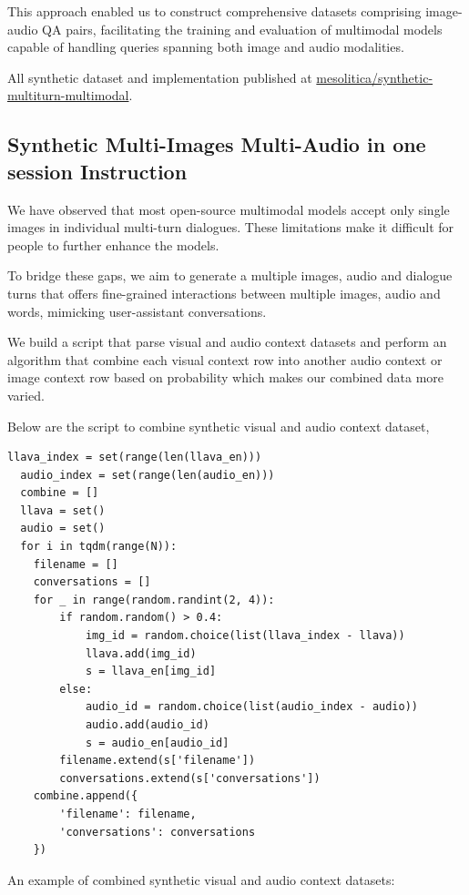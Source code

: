 \documentclass[preprint]{article}
\begin{document}
This approach enabled us to construct comprehensive datasets comprising image-audio QA pairs, facilitating the training and evaluation of multimodal models capable of handling queries spanning both image and audio modalities.

All synthetic dataset and implementation published at \href{https://huggingface.co/datasets/mesolitica/synthetic-multiturn-multimodal#multi-images-multi-audio}{mesolitica/synthetic-multiturn-multimodal}.

\subsection{Synthetic Multi-Images Multi-Audio in one session Instruction}

We have observed that most open-source multimodal models accept only single images in individual multi-turn dialogues. These limitations make it difficult for people to further enhance the models.

To bridge these gaps, we aim to generate a multiple images, audio and dialogue turns that offers fine-grained interactions between multiple images, audio and words, mimicking user-assistant conversations.

We build a script that parse visual and audio context datasets and perform an algorithm that combine each visual context row into another audio context or image context row based on probability which makes our combined data more varied.

Below are the script to combine synthetic visual and audio context dataset,

\begin{lstlisting}[breaklines=true]
  llava_index = set(range(len(llava_en)))
  audio_index = set(range(len(audio_en)))
  combine = []
  llava = set()
  audio = set()
  for i in tqdm(range(N)):
    filename = []
    conversations = []
    for _ in range(random.randint(2, 4)):
        if random.random() > 0.4:
            img_id = random.choice(list(llava_index - llava))
            llava.add(img_id)
            s = llava_en[img_id]
        else:
            audio_id = random.choice(list(audio_index - audio))
            audio.add(audio_id)
            s = audio_en[audio_id]
        filename.extend(s['filename'])
        conversations.extend(s['conversations'])
    combine.append({
        'filename': filename,
        'conversations': conversations
    })
\end{lstlisting}

An example of combined synthetic visual and audio context datasets:
\end{document}
